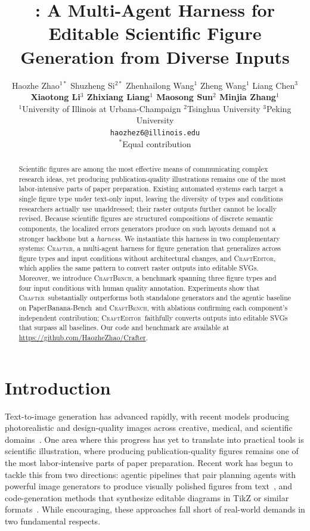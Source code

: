 \documentclass{article}
\title{\Crafter: A Multi-Agent Harness for Editable Scientific Figure Generation from Diverse Inputs}
\author{
  Haozhe Zhao$^{1*}$ \quad Shuzheng Si$^{2*}$ \quad Zhenhailong Wang$^{1}$ \quad Zheng Wang$^{1}$ \quad Liang Chen$^{3}$ \\
  \textbf{Xiaotong Li$^{3}$ \quad Zhixiang Liang$^{1}$ \quad Maosong Sun$^{2}$ \quad Minjia Zhang$^{1}$} \\[0.5em]
  $^{1}$University of Illinois at Urbana-Champaign \quad $^{2}$Tsinghua University \quad $^{3}$Peking University \\
  \texttt{haozhez6@illinois.edu} \\[0.3em]
  {\small $^{*}$Equal contribution }
}
\newcommand{\Crafter}{\textsc{Crafter}\xspace}
\newcommand{\Editor}{\textsc{CraftEditor}\xspace}
\newcommand{\CrafterBench}{\textsc{CraftBench}\xspace}
\newcommand{\PaperBananaBench}{PaperBanana-Bench\xspace}
\begin{document}
\maketitle

\begin{abstract}
Scientific figures are among the most effective means of communicating complex research ideas, yet producing publication-quality illustrations remains one of the most labor-intensive parts of paper preparation. Existing automated systems each target a single figure type under text-only input, leaving the diversity of types and conditions researchers actually use unaddressed; their raster outputs further cannot be locally revised. Because scientific figures are structured compositions of discrete semantic components, the localized errors generators produce on such layouts demand not a stronger backbone but a \emph{harness}. We instantiate this harness in two complementary systems: \Crafter, a multi-agent harness for figure generation that generalizes across figure types and input conditions without architectural changes, and \Editor, which applies the same pattern to convert raster outputs into editable SVGs. Moreover, we introduce \CrafterBench, a benchmark spanning three figure types and
four input conditions with human quality annotation. Experiments show
that \Crafter\ substantially outperforms both standalone generators and
the agentic baseline on \PaperBananaBench\ and \CrafterBench,
with ablations confirming each component's independent contribution;
\Editor\ faithfully converts outputs into editable SVGs that surpass all baselines. Our code and benchmark are available at \url{https://github.com/HaozheZhao/Crafter}.
\end{abstract}

\section{Introduction}
\label{sec:intro}

Text-to-image generation has advanced rapidly, with recent models producing photorealistic and design-quality images across creative, medical, and scientific domains~\citep{qwen2025image,glm2025image,labs2024flux}. One area where this progress has yet to translate into practical tools is scientific illustration, where producing publication-quality figures remains one of the most labor-intensive parts of paper preparation. Recent work has begun to tackle this from two directions: agentic pipelines that pair planning agents with powerful image generators to produce visually polished figures from text~\citep{zhu2026paperbanana,zhu2026autofigure,sun2025p2p,guo2026paper2sysarch,kukreja2026cage,yang2026omnidiagram}, and code-generation methods that synthesize editable diagrams in TikZ or similar formats~\citep{belouadi2024automatikz,zala2024diagrammergpt,greisinger2026tikzilla,PPTAgent}. While encouraging, these approaches fall short of real-world demands in
two fundamental respects.
\end{document}
